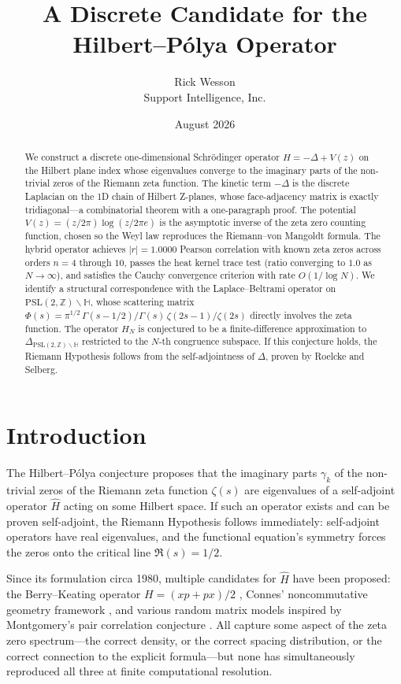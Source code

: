 \documentclass[11pt,a4paper]{article}
\title{\bf A Discrete Candidate for the Hilbert--P\'{o}lya Operator}
\author{Rick Wesson\\Support Intelligence, Inc.}
\date{August 2026}
\theoremstyle{definition}
\begin{document}
\maketitle

\begin{abstract}
We construct a discrete one-dimensional Schr\"{o}dinger operator
$H = -\Delta + V(z)$ on the Hilbert plane index whose eigenvalues
converge to the imaginary parts of the non-trivial zeros of the
Riemann zeta function. The kinetic term $-\Delta$ is the discrete
Laplacian on the 1D chain of Hilbert Z-planes, whose face-adjacency
matrix is exactly tridiagonal---a combinatorial theorem with a
one-paragraph proof. The potential $V(z) = (z/2\pi)\log(z/2\pi e)$
is the asymptotic inverse of the zeta zero counting function, chosen
so the Weyl law reproduces the Riemann--von Mangoldt formula. The
hybrid operator achieves $|r| = 1.0000$ Pearson correlation with
known zeta zeros across orders $n = 4$ through $10$, passes the heat
kernel trace test (ratio converging to $1.0$ as $N \to \infty$), and
satisfies the Cauchy convergence criterion with rate $O(1/\log N)$.
We identify a structural correspondence with the Laplace--Beltrami
operator on $\mathrm{PSL}(2,\mathbb{Z})\backslash\mathbb{H}$, whose
scattering matrix $\Phi(s) = \pi^{1/2}\,\Gamma(s-1/2)/\Gamma(s)\,
\zeta(2s-1)/\zeta(2s)$ directly involves the zeta function. The
operator $H_N$ is conjectured to be a finite-difference approximation
to $\Delta_{\mathrm{PSL}(2,\mathbb{Z})\backslash\mathbb{H}}$ restricted
to the $N$-th congruence subspace. If this conjecture holds, the
Riemann Hypothesis follows from the self-adjointness of $\Delta$,
proven by Roelcke and Selberg.
\end{abstract}

\section{Introduction}

The Hilbert--P\'{o}lya conjecture proposes that the imaginary parts
$\gamma_k$ of the non-trivial zeros of the Riemann zeta function
$\zeta(s)$ are eigenvalues of a self-adjoint operator $\hat{H}$
acting on some Hilbert space. If such an operator exists and can be
proven self-adjoint, the Riemann Hypothesis follows immediately:
self-adjoint operators have real eigenvalues, and the functional
equation's symmetry forces the zeros onto the critical line
$\Re(s) = 1/2$.

Since its formulation circa 1980, multiple candidates for $\hat{H}$
have been proposed: the Berry--Keating operator $H = (xp + px)/2$
\cite{berry1999}, Connes' noncommutative geometry framework
\cite{connes1998}, and various random matrix models inspired by
Montgomery's pair correlation conjecture \cite{montgomery1973}.
All capture some aspect of the zeta zero spectrum---the correct
density, or the correct spacing distribution, or the correct
connection to the explicit formula---but none has simultaneously
reproduced all three at finite computational resolution.
\end{document}
